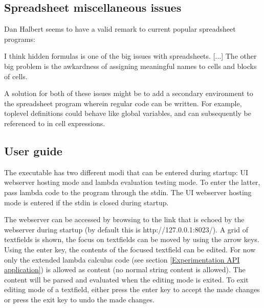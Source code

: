 \documentclass[10pt,a4paper]{article}
\begin{document}
\subsection{Spreadsheet miscellaneous issues}
\label{Spreadsheet miscellaneous issues}
Dan Halbert seems to have a valid remark to current popular spreadsheet programs:
\begin{displayquote}[Halbert, 2012]
I think hidden formulas is one of the big issues with spreadsheets. [...] The other big problem
is the awkardness of assigning meaningful names to cells and blocks of cells.
\end{displayquote}
A solution for both of these issues might be to add a secondary environment to the spreadsheet program
wherein regular code can be written. For example, toplevel definitions could behave like global
variables, and can subsequently be referenced to in cell expressions.

\newpage
\subsection{User guide}
The executable has two different modi that can be entered during startup: UI webserver hosting mode and lambda
evaluation testing mode. To enter the latter, pass lambda code to the program through the stdin.
The UI webserver hosting mode is entered if the stdin is closed during startup.

The webserver can be accessed by browsing to the link that is echoed by the webserver during startup
(by default this is http://127.0.0.1:8023/). A grid of textfields is shown, the focus on textfields
can be moved by using the arrow keys. Using the enter key, the contents of the focused textfield can be edited.
For now only the extended lambda calculus code (see section \ref{Experimentation API application})
is allowed as content (no normal string content is allowed). The content will be parsed and evaluated
when the editing mode is exited.
To exit editing mode of a textfield, either press the enter key to accept the made changes or
press the exit key to undo the made changes.
\end{document}
